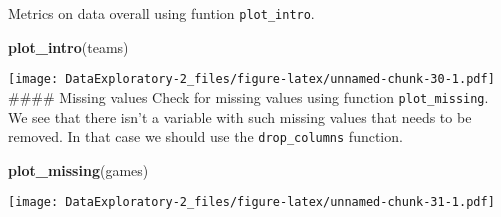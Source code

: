 \documentclass[
]{article}
\newenvironment{Shaded}{\begin{snugshade}}{\end{snugshade}}
\newcommand{\KeywordTok}[1]{\textcolor[rgb]{0.13,0.29,0.53}{\textbf{#1}}}
\newcommand{\NormalTok}[1]{#1}
\begin{document}
Metrics on data overall using funtion \texttt{plot\_intro}.

\begin{Shaded}
\begin{Highlighting}[]
\KeywordTok{plot\_intro}\NormalTok{(teams)}
\end{Highlighting}
\end{Shaded}

\texttt{[image: DataExploratory-2\_files/figure-latex/unnamed-chunk-30-1.pdf]}
\#\#\#\# Missing values Check for missing values using function
\texttt{plot\_missing}. We see that there isn't a variable with such
missing values that needs to be removed. In that case we should use the
\texttt{drop\_columns} function.

\begin{Shaded}
\begin{Highlighting}[]
\KeywordTok{plot\_missing}\NormalTok{(games)}
\end{Highlighting}
\end{Shaded}

\texttt{[image: DataExploratory-2\_files/figure-latex/unnamed-chunk-31-1.pdf]}
\end{document}
